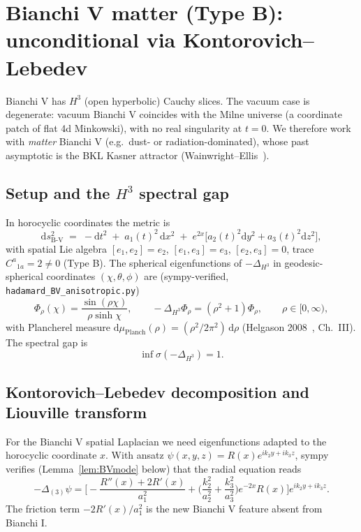 \documentclass[11pt]{article}
\theoremstyle{definition}
\newcommand{\BV}{\mathrm{B\text{-}V}}
\begin{document}
\section{Bianchi V matter (Type B): unconditional via Kontorovich--Lebedev}\label{sec:bianchi-V}

Bianchi V has $H^3$ (open hyperbolic) Cauchy slices. The vacuum case is degenerate: vacuum Bianchi V coincides with the Milne universe (a coordinate patch of flat 4d Minkowski), with no real singularity at $t=0$. We therefore work with \emph{matter} Bianchi V (e.g.\ dust- or radiation-dominated), whose past asymptotic is the BKL Kasner attractor (Wainwright--Ellis~\cite[\S6.4]{WainwrightEllis1997}).

\subsection{\texorpdfstring{Setup and the $H^3$ spectral gap}{Setup and the H3 spectral gap}}\label{sec:BV-setup}

In horocyclic coordinates the metric is
\begin{equation}\label{eq:metric-BV}
\mathrm{d}s^2_\BV \;=\; -\mathrm{d}t^2 \;+\; a_1(t)^2\,\mathrm{d}x^2 \;+\; e^{2x}\bigl[a_2(t)^2\mathrm{d}y^2 + a_3(t)^2\mathrm{d}z^2\bigr],
\end{equation}
with spatial Lie algebra $[e_1,e_2]=e_2$, $[e_1,e_3]=e_3$, $[e_2,e_3]=0$, trace $C^a{}_{1a}=2\neq 0$ (Type B). The spherical eigenfunctions of $-\Delta_{H^3}$ in geodesic-spherical coordinates $(\chi,\theta,\phi)$ are (sympy-verified, \texttt{hadamard\_BV\_anisotropic.py})
\begin{equation}\label{eq:phirho}
\Phi_\rho(\chi) = \frac{\sin(\rho\chi)}{\rho\sinh\chi},\qquad -\Delta_{H^3}\Phi_\rho = (\rho^2+1)\Phi_\rho,\qquad\rho\in[0,\infty),
\end{equation}
with Plancherel measure $\mathrm{d}\mu_{\mathrm{Planch}}(\rho) = (\rho^2/2\pi^2)\,\mathrm{d}\rho$ (Helgason 2008~\cite{Helgason2008}, Ch.~III). The spectral gap is
\begin{equation}\label{eq:H3-gap}
\inf\sigma(-\Delta_{H^3}) = 1.
\end{equation}

\subsection{Kontorovich--Lebedev decomposition and Liouville transform}\label{sec:BV-KL}

For the Bianchi V spatial Laplacian we need eigenfunctions adapted to the horocyclic coordinate $x$. With ansatz $\psi(x,y,z) = R(x)e^{ik_2 y+ik_3 z}$, sympy verifies (Lemma~\ref{lem:BVmode} below) that the radial equation reads
\begin{equation}\label{eq:BV-radial}
-\Delta_{(3)}\psi = \biggl[-\frac{R''(x)+2R'(x)}{a_1^2} + \biggl(\frac{k_2^2}{a_2^2}+\frac{k_3^2}{a_3^2}\biggr)e^{-2x}R(x)\biggr]e^{ik_2 y+ik_3 z}.
\end{equation}
The friction term $-2R'(x)/a_1^2$ is the new Bianchi V feature absent from Bianchi I.
\end{document}
